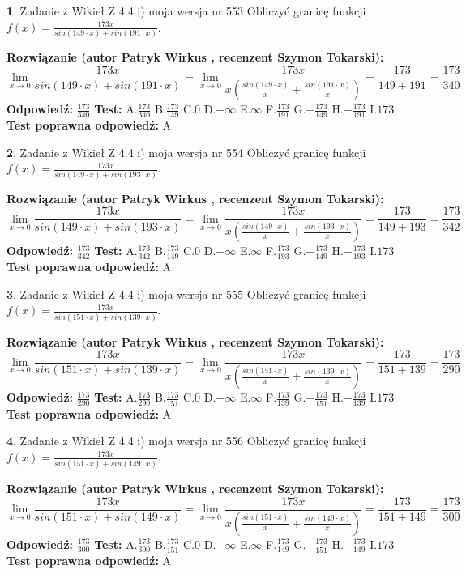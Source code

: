 \documentclass[12pt, a4paper]{article}
\theoremstyle{definition} %
\newtheorem{zad}{}
\newcommand{\zadStart}[1]{\begin{zad}#1\newline}
\newcommand{\zadStop}{\end{zad}}
\newcommand{\rozwStart}[2]{\noindent \textbf{Rozwiązanie (autor #1 , recenzent #2): }\newline}
\newcommand{\rozwStop}{\newline}
\newcommand{\odpStart}{\noindent \textbf{Odpowiedź:}\newline}
\newcommand{\odpStop}{\newline}
\newcommand{\testStart}{\noindent \textbf{Test:}\newline}
\newcommand{\testStop}{\newline}
\newcommand{\kluczStart}{\noindent \textbf{Test poprawna odpowiedź:}\newline}
\newcommand{\kluczStop}{\newline}
\begin{document}
\zadStart{Zadanie z Wikieł Z 4.4 i) moja wersja nr 553}
Obliczyć granicę funkcji $f(x)=\frac{173x}{sin(149\cdot x) +sin(191\cdot x)}$.
\zadStop
\rozwStart{Patryk Wirkus}{Szymon Tokarski}
$$\lim\limits_{x\to 0}\frac{173x}{sin(149\cdot x) +sin(191\cdot x)}=\lim\limits_{x\to 0}\frac{173x}{x(\frac{sin(149\cdot x)}{x}+\frac{sin(191\cdot x)}{x})}=\frac{173}{149+191} = \frac{173}{340}$$
\rozwStop
\odpStart
$\frac{173}{340}$
\odpStop
\testStart
A.$\frac{173}{340}$
B.$\frac{173}{149}$
C.$0$
D.$-\infty$
E.$\infty$
F.$\frac{173}{191}$
G.$-\frac{173}{149}$
H.$-\frac{173}{191}$
I.$173$
\testStop
\kluczStart
A
\kluczStop



\zadStart{Zadanie z Wikieł Z 4.4 i) moja wersja nr 554}
Obliczyć granicę funkcji $f(x)=\frac{173x}{sin(149\cdot x) +sin(193\cdot x)}$.
\zadStop
\rozwStart{Patryk Wirkus}{Szymon Tokarski}
$$\lim\limits_{x\to 0}\frac{173x}{sin(149\cdot x) +sin(193\cdot x)}=\lim\limits_{x\to 0}\frac{173x}{x(\frac{sin(149\cdot x)}{x}+\frac{sin(193\cdot x)}{x})}=\frac{173}{149+193} = \frac{173}{342}$$
\rozwStop
\odpStart
$\frac{173}{342}$
\odpStop
\testStart
A.$\frac{173}{342}$
B.$\frac{173}{149}$
C.$0$
D.$-\infty$
E.$\infty$
F.$\frac{173}{193}$
G.$-\frac{173}{149}$
H.$-\frac{173}{193}$
I.$173$
\testStop
\kluczStart
A
\kluczStop



\zadStart{Zadanie z Wikieł Z 4.4 i) moja wersja nr 555}
Obliczyć granicę funkcji $f(x)=\frac{173x}{sin(151\cdot x) +sin(139\cdot x)}$.
\zadStop
\rozwStart{Patryk Wirkus}{Szymon Tokarski}
$$\lim\limits_{x\to 0}\frac{173x}{sin(151\cdot x) +sin(139\cdot x)}=\lim\limits_{x\to 0}\frac{173x}{x(\frac{sin(151\cdot x)}{x}+\frac{sin(139\cdot x)}{x})}=\frac{173}{151+139} = \frac{173}{290}$$
\rozwStop
\odpStart
$\frac{173}{290}$
\odpStop
\testStart
A.$\frac{173}{290}$
B.$\frac{173}{151}$
C.$0$
D.$-\infty$
E.$\infty$
F.$\frac{173}{139}$
G.$-\frac{173}{151}$
H.$-\frac{173}{139}$
I.$173$
\testStop
\kluczStart
A
\kluczStop



\zadStart{Zadanie z Wikieł Z 4.4 i) moja wersja nr 556}
Obliczyć granicę funkcji $f(x)=\frac{173x}{sin(151\cdot x) +sin(149\cdot x)}$.
\zadStop
\rozwStart{Patryk Wirkus}{Szymon Tokarski}
$$\lim\limits_{x\to 0}\frac{173x}{sin(151\cdot x) +sin(149\cdot x)}=\lim\limits_{x\to 0}\frac{173x}{x(\frac{sin(151\cdot x)}{x}+\frac{sin(149\cdot x)}{x})}=\frac{173}{151+149} = \frac{173}{300}$$
\rozwStop
\odpStart
$\frac{173}{300}$
\odpStop
\testStart
A.$\frac{173}{300}$
B.$\frac{173}{151}$
C.$0$
D.$-\infty$
E.$\infty$
F.$\frac{173}{149}$
G.$-\frac{173}{151}$
H.$-\frac{173}{149}$
I.$173$
\testStop
\kluczStart
A
\kluczStop
\end{document}
